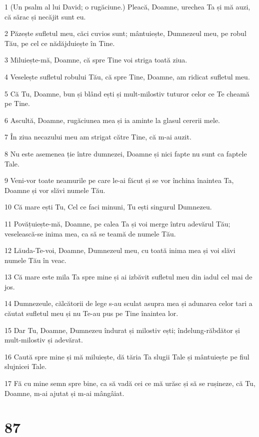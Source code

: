 \par 1 (Un psalm al lui David; o rugăciune.) Pleacă, Doamne, urechea Ta și mă auzi, că sărac și necăjit sunt eu.
\par 2 Păzește sufletul meu, căci cuvios sunt; mântuiește, Dumnezeul meu, pe robul Tău, pe cel ce nădăjduiește în Tine.
\par 3 Miluiește-mă, Doamne, că spre Tine voi striga toată ziua.
\par 4 Veselește sufletul robului Tău, că spre Tine, Doamne, am ridicat sufletul meu.
\par 5 Că Tu, Doamne, bun și blând ești și mult-milostiv tuturor celor ce Te cheamă pe Tine.
\par 6 Ascultă, Doamne, rugăciunea mea și ia aminte la glasul cererii mele.
\par 7 În ziua necazului meu am strigat către Tine, că m-ai auzit.
\par 8 Nu este asemenea ție între dumnezei, Doamne și nici fapte nu sunt ca faptele Tale.
\par 9 Veni-vor toate neamurile pe care le-ai făcut și se vor închina înaintea Ta, Doamne și vor slăvi numele Tău.
\par 10 Că mare ești Tu, Cel ce faci minuni, Tu ești singurul Dumnezeu.
\par 11 Povățuiește-mă, Doamne, pe calea Ta și voi merge întru adevărul Tău; veselească-se inima mea, ca să se teamă de numele Tău.
\par 12 Lăuda-Te-voi, Doamne, Dumnezeul meu, cu toată inima mea și voi slăvi numele Tău în veac.
\par 13 Că mare este mila Ta spre mine și ai izbăvit sufletul meu din iadul cel mai de jos.
\par 14 Dumnezeule, călcătorii de lege s-au sculat asupra mea și adunarea celor tari a căutat sufletul meu și nu Te-au pus pe Tine înaintea lor.
\par 15 Dar Tu, Doamne, Dumnezeu îndurat și milostiv ești; îndelung-răbdător și mult-milostiv și adevărat.
\par 16 Caută spre mine și mă miluiește, dă tăria Ta slugii Tale și mântuiește pe fiul slujnicei Tale.
\par 17 Fă cu mine semn spre bine, ca să vadă cei ce mă urăsc și să se rușineze, că Tu, Doamne, m-ai ajutat și m-ai mângâiat.

\chapter{87}

